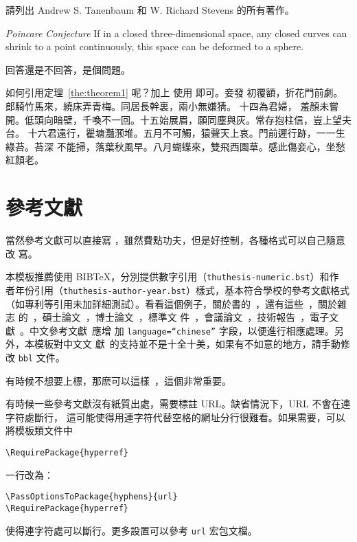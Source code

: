 \begin{exercise}
  請列出 Andrew S. Tanenbaum 和 W. Richard Stevens 的所有著作。
\end{exercise}

\begin{conjecture} \textit{Poincare Conjecture} If in a closed three-dimensional
  space, any closed curves can shrink to a point continuously, this space can be
  deformed to a sphere.
\end{conjecture}

\begin{problem}
 回答還是不回答，是個問題。 
\end{problem}

如何引用定理~\ref{the:theorem1} 呢？加上  使用  即可。妾發
初覆額，折花門前劇。郎騎竹馬來，繞床弄青梅。同居長幹裏，兩小無嫌猜。 十四為君婦，
羞顏未嘗開。低頭向暗壁，千喚不一回。十五始展眉，願同塵與灰。常存抱柱信，豈上望夫
台。 十六君遠行，瞿塘灩滪堆。五月不可觸，猿聲天上哀。門前遲行跡，一一生綠苔。苔深
不能掃，落葉秋風早。八月蝴蝶來，雙飛西園草。感此傷妾心，坐愁紅顏老。

\section{參考文獻}
\label{sec:bib}
當然參考文獻可以直接寫 ，雖然費點功夫，但是好控制，各種格式可以自己隨意改
寫。

本模板推薦使用 BIB\TeX，分別提供數字引用（\texttt{thuthesis-numeric.bst}）和作
者年份引用（\texttt{thuthesis-author-year.bst}）樣式，基本符合學校的參考文獻格式
（如專利等引用未加詳細測試）。看看這個例子，關於書的~\cite{tex, companion,
  ColdSources}，還有這些~\cite{Krasnogor2004e, clzs, zjsw}，關於雜志
的~\cite{ELIDRISSI94, MELLINGER96, SHELL02}，碩士論文~\cite{zhubajie,
  metamori2004}，博士論文~\cite{shaheshang, FistSystem01}，標準文
件~\cite{IEEE-1363}，會議論文~\cite{DPMG,kocher99}，技術報告~\cite{NPB2}，電子文
獻~\cite{chuban2001,oclc2000}。中文參考文獻~\cite{cnarticle}應增
加 \texttt{language=``chinese''} 字段，以便進行相應處理。另外，本模板對中文文
獻~\cite{cnproceed}的支持並不是十全十美，如果有不如意的地方，請手動修
改 \texttt{bbl} 文件。

有時候不想要上標，那麽可以這樣~，這個非常重要。

有時候一些參考文獻沒有紙質出處，需要標註 URL。缺省情況下，URL 不會在連字符處斷行，
這可能使得用連字符代替空格的網址分行很難看。如果需要，可以將模板類文件中
\begin{verbatim}
\RequirePackage{hyperref}
\end{verbatim}
一行改為：
\begin{verbatim}
\PassOptionsToPackage{hyphens}{url}
\RequirePackage{hyperref}
\end{verbatim}
使得連字符處可以斷行。更多設置可以參考 \texttt{url} 宏包文檔。


